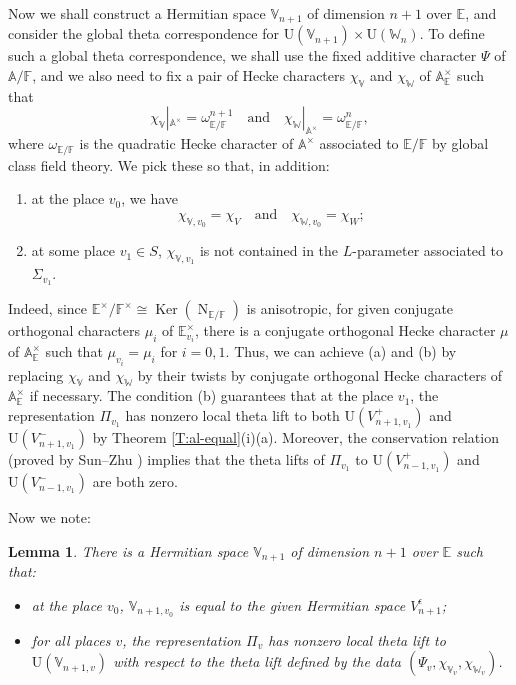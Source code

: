 \documentclass[11pt]{amsart}
\numberwithin{equation}{section}
\theoremstyle{plain}
\newtheorem{lem}[thm]{Lemma}
\theoremstyle{definition}
\theoremstyle{remark}
\def\Ker{\operatorname{Ker}}
\def\N{\operatorname{N}}
\def\U{\mathrm{U}}
\def\AA{\mathbb{A}}
\def\EE{\mathbb{E}}
\def\FF{\mathbb{F}}
\def\VV{\mathbb{V}}
\def\WW{\mathbb{W}}
\begin{document}
Now we shall construct a Hermitian space $\VV_{n+1}$ of dimension $n+1$ over $\EE$, and consider the global theta correspondence for $\U(\VV_{n+1}) \times \U(\WW_n)$. To define such a global theta correspondence, we shall use the fixed additive character $\Psi$ of $\AA / \FF$, and we also need to fix a pair of Hecke characters $\chi_{\VV}$ and $\chi_{\WW}$ of $\AA_{\EE}^{\times}$ such that
\[  \chi_{\VV}|_{\AA^{\times}}  = \omega_{\EE/ \FF}^{n+1} \quad \text{and} \quad \chi_{\WW}|_{\AA^{\times}}  = \omega_{\EE/ \FF}^n, \]
where $\omega_{\EE/ \FF}$ is the quadratic Hecke character of $\AA^{\times}$ associated to $\EE/\FF$ by global class field theory. We pick these so that, in addition:
\begin{enumerate}[label=(\alph*)]
\item at the place $v_0$, we have
\[  \chi_{\VV,v_0}  = \chi_V \quad \text{and} \quad  \chi_{\WW,v_0} = \chi_W; \]
\item at some place $v_1 \in S$, $\chi_{\VV,v_1}$ is not contained in the $L$-parameter associated to $\Sigma_{v_1}$. 
\end{enumerate}
Indeed, since $\EE^{\times} / \FF^{\times} \cong \Ker(\N_{\EE/\FF})$ is anisotropic,
for given conjugate orthogonal characters $\mu_i$ of $\EE_{v_i}^{\times}$,
there is a conjugate orthogonal Hecke character $\mu$ of $\AA_{\EE}^{\times}$ such that $\mu_{v_i} = \mu_i$ for $i=0,1$.
Thus, we can achieve (a) and (b) by replacing $\chi_{\VV}$ and $\chi_{\WW}$ by their twists by conjugate orthogonal Hecke characters of $\AA_\EE^{\times}$ if necessary.
The condition (b) guarantees that at the place $v_1$, the representation $\Pi_{v_1}$ has nonzero local theta lift to both $\U(V_{n+1,v_1}^+)$ and $\U(V_{n+1, v_1}^-)$ by Theorem \ref{T:al-equal}(i)(a).
Moreover, the conservation relation (proved by Sun--Zhu \cite{sz}) implies that the theta lifts of $\Pi_{v_1}$ to $\U(V_{n-1,v_1}^+)$ and $\U(V_{n-1, v_1}^-)$ are both zero. 

Now we note:

\begin{lem}
There is a Hermitian space $\VV_{n+1}$ of dimension $n+1$ over $\EE$ such that:
\begin{itemize}
\item at the place $v_0$, $\VV_{n+1,v_0}$ is equal to the given Hermitian space $V_{n+1}^\epsilon$;
\item for all places $v$, the representation $\Pi_v$ has nonzero local theta lift to $\U(\VV_{n+1,v})$ with respect to the theta lift defined by the data $(\Psi_v, \chi_{\VV_v}, \chi_{\WW_v})$.
\end{itemize}
\end{lem}
\end{document}
